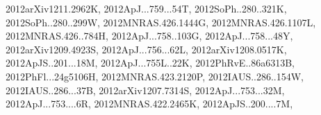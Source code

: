 \documentclass[12pt]{article}
\begin{document}
\begin{description}
{2012arXiv1211.2962K,%
2012ApJ...759...54T,%
2012SoPh..280..321K,%
2012SoPh..280..299W,%
2012MNRAS.426.1444G,%
2012MNRAS.426.1107L,%
2012MNRAS.426..784H,%
2012ApJ...758..103G,%
2012ApJ...758...48Y,%
2012arXiv1209.4923S,%
2012ApJ...756...62L,%
2012arXiv1208.0517K,%
2012ApJS..201...18M,%
2012ApJ...755L..22K,%
2012PhRvE..86a6313B,%
2012PhFl...24g5106H,%
2012MNRAS.423.2120P,%
2012IAUS..286..154W,%
2012IAUS..286...37B,%
2012arXiv1207.7314S,%
2012ApJ...753...32M,%
2012ApJ...753....6R,%
2012MNRAS.422.2465K,%
2012ApJS..200....7M,%
}
\end{description}
\end{document}
